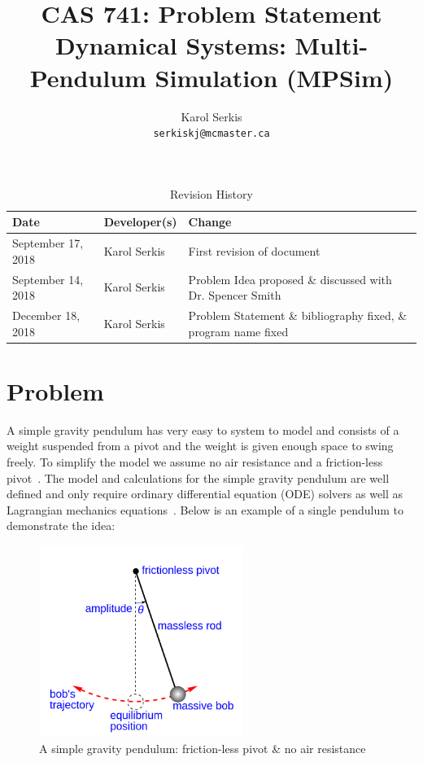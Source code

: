 \documentclass{article}
\title{CAS 741: Problem Statement\\[10pt]\Large Dynamical Systems: 
Multi-Pendulum Simulation (MPSim)}
\author{Karol Serkis\\\texttt{serkiskj@mcmaster.ca}}
\date{}
\begin{document}

\maketitle

\begin{table}[hp]
\caption{Revision History} \label{TblRevisionHistory}
\begin{tabularx}{\textwidth}{llX}
\toprule
\textbf{Date} & \textbf{Developer(s)} & \textbf{Change}\\
\midrule
September 17, 2018 & Karol Serkis & First revision of document\\
September 14, 2018 & Karol Serkis & Problem Idea proposed \& discussed with Dr.
Spencer Smith \\
December 18, 2018 & Karol Serkis & Problem Statement \& bibliography fixed, 
\& program name fixed \\
\bottomrule
\end{tabularx}
\end{table}

\section*{Problem}

A simple gravity pendulum has very easy to system to model and consists of a
weight suspended from a pivot and the weight is given enough space to swing
freely. To simplify the model we assume no air resistance and a friction-less
pivot~\cite{WikiPendulum}. The model and calculations for the simple gravity 
pendulum are well defined and only require ordinary differential equation (ODE) 
solvers as well as Lagrangian mechanics equations~\cite{MathPendulum}. Below
is an example of a single pendulum to demonstrate the idea:
\begin{figure}[H]
	\centering
	\includegraphics[width=250px]{simple-pend.png}
\caption{A simple gravity pendulum: friction-less pivot \& no air 
resistance~\cite{WikiPendulum}}
	\label{fig:simplepend}
\end{figure}
\end{document}
